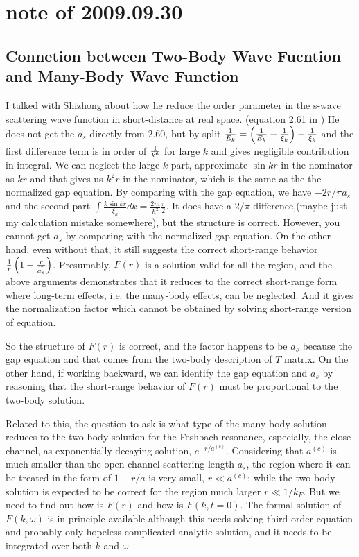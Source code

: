 \section{note of 2009.09.30}
\subsection{Connetion between Two-Body Wave Fucntion and Many-Body Wave Function}
I talked with Shizhong about how he reduce the order parameter in the s-wave scattering wave function in short-distance at real space. (equation 2.61 in \cite{ZhangThesis})  He does not get the $a_s$ directly from 2.60, but by split $\frac{1}{E_k}=\left(\frac{1}{E_k}-\frac{1}{\xi_k}\right)+\frac{1}{\xi_k}$ and the first difference term is in order of $\frac{1}{k^6}$ for large $k$ and gives negligible contribution in integral. We can neglect the large $k$ part, approximate $\sin{kr}$ in the nominator as $kr$ and that gives us $k^2r$ in the nominator, which is the same as the the normalized gap equation. By comparing with the gap equation, we have $-2r/\pi{a_s}$ and the second part $\int\frac{k\sin{kr}}{\xi_k}dk=\frac{2m}{\hbar^2}\frac{\pi}{2}$.  It does have a $2/\pi$ difference,(maybe just my calculation mistake somewhere), but the structure is correct.  However, you cannot get $a_s$ by comparing with the normalized gap equation.  On the other hand, even without that, it still suggests the correct short-range behavior $\frac{1}{r}\left(1-\frac{r}{\widetilde{a_s}}\right)$.  Presumably, $F(r)$ is a solution valid for all the region, and the above arguments demonstrates that it reduces to the correct short-range form where long-term effects, i.e. the many-body effects, can be neglected. And it gives the normalization factor which cannot be obtained by solving short-range version of equation.  

So the structure of $F(r)$ is correct, and the factor happens to be $a_s$ because the gap equation and that comes from the two-body description of $T$ matrix. On the other hand, if working backward, we can identify the gap equation and $a_s$ by reasoning that the short-range behavior of $F(r)$ must be proportional to the two-body solution. 

Related to this, the question to ask is what type of the many-body solution reduces to the two-body solution for the Feshbach resonance, especially, the close channel, as exponentially decaying solution, $e^{-r/a^{(c)}}$.  Considering that $a^{(c)}$ is much smaller than the open-channel scattering length $a_s$, the region where it can be treated in the form of $1-r/a$ is very small, $r{\ll}a^{(c)}$; while the two-body solution is expected to be correct for the region much larger $r{\ll}1/k_F$.  But we need to find out how is $F(r)$ and how is $F(k,t=0)$.  The formal solution of $F(k,\omega)$ is in principle available although this needs solving third-order equation and probably only hopeless complicated analytic solution, and it needs to be integrated over both $k$ and $\omega$.  


